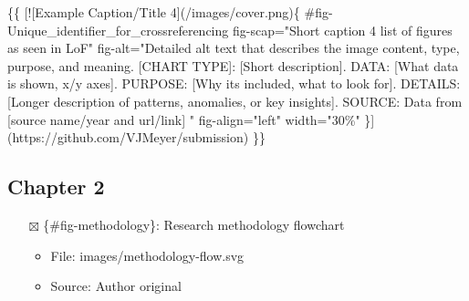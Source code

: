 \documentclass[
  11pt,
  letterpaper,
]{book}
\newenvironment{Shaded}{\begin{snugshade}}{\end{snugshade}}
\newcommand{\CommentTok}[1]{\textcolor[rgb]{0.37,0.37,0.37}{#1}}
\newcommand{\NormalTok}[1]{\textcolor[rgb]{0.00,0.23,0.31}{#1}}
\newcommand{\OtherTok}[1]{\textcolor[rgb]{0.00,0.23,0.31}{#1}}
\providecommand{\tightlist}{%
  \setlength{\itemsep}{0pt}\setlength{\parskip}{0pt}}
\begin{document}
\begin{Shaded}
\begin{Highlighting}[]
\NormalTok{\{\{}
\CommentTok{[}\OtherTok{![Example Caption/Title 4}\CommentTok{](/images/cover.png)}\NormalTok{\{}
\NormalTok{    \#fig{-}Unique\_identifier\_for\_crossreferencing}
\NormalTok{    fig{-}scap="Short caption 4 list of figures as seen in LoF"}
\NormalTok{    fig{-}alt="Detailed alt text that describes the image content, type, purpose, and meaning.}
            \OtherTok{[CHART TYPE]: }\CommentTok{[}\OtherTok{Short description}\CommentTok{]}\NormalTok{.}
\NormalTok{                DATA: }\CommentTok{[}\OtherTok{What data is shown, x/y axes}\CommentTok{]}\NormalTok{.}
\NormalTok{                PURPOSE: }\CommentTok{[}\OtherTok{Why it\textquotesingle{}s included, what to look for}\CommentTok{]}\NormalTok{.}
\NormalTok{                DETAILS: }\CommentTok{[}\OtherTok{Longer description of patterns, anomalies, or key insights}\CommentTok{]}\NormalTok{.}
\NormalTok{                SOURCE: Data from }\CommentTok{[}\OtherTok{source name/year and url/link}\CommentTok{]}
\NormalTok{            "}
\NormalTok{    fig{-}align="left"}
\NormalTok{    width="30\%"}
\NormalTok{    \}](https://github.com/VJMeyer/submission)}
\NormalTok{\}\}}
\end{Highlighting}
\end{Shaded}

\subsection{Chapter 2}\label{chapter-2}

\begin{itemize}
\tightlist
\item[$\boxtimes$]
  \{\#fig-methodology\}: Research methodology flowchart

  \begin{itemize}
  \tightlist
  \item
    File: images/methodology-flow.svg
  \item
    Source: Author original
  \end{itemize}
\end{itemize}
\end{document}

